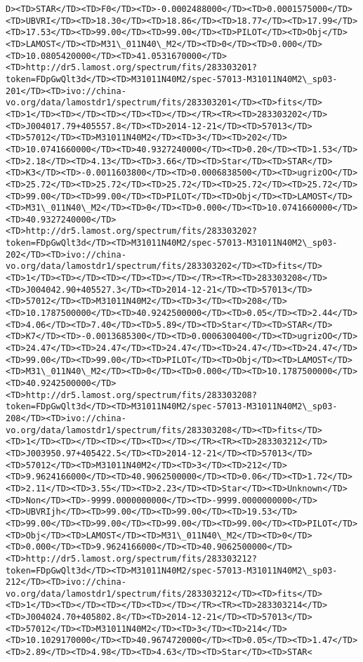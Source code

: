 \documentclass[11pt]{article}
\begin{document}
\begin{Verbatim}[commandchars=\\\{\}]
D><TD>STAR</TD><TD>F0</TD><TD>-0.0002488000</TD><TD>0.0001575000</TD><TD>UBVRI</TD><TD>18.30</TD><TD>18.86</TD><TD>18.77</TD><TD>17.99</TD><TD>17.53</TD><TD>99.00</TD><TD>99.00</TD><TD>PILOT</TD><TD>Obj</TD><TD>LAMOST</TD><TD>M31\_011N40\_M2</TD><TD>0</TD><TD>0.000</TD><TD>10.0805420000</TD><TD>41.0531670000</TD><TD>http://dr5.lamost.org/spectrum/fits/283303201?token=FDpGwQlt3d</TD><TD>M31011N40M2/spec-57013-M31011N40M2\_sp03-201</TD><TD>ivo://china-vo.org/data/lamostdr1/spectrum/fits/283303201</TD><TD>fits</TD><TD>1</TD><TD></TD><TD></TD><TD></TD></TR><TR><TD>283303202</TD><TD>J004017.79+405557.8</TD><TD>2014-12-21</TD><TD>57013</TD><TD>57012</TD><TD>M31011N40M2</TD><TD>3</TD><TD>202</TD><TD>10.0741660000</TD><TD>40.9327240000</TD><TD>0.20</TD><TD>1.53</TD><TD>2.18</TD><TD>4.13</TD><TD>3.66</TD><TD>Star</TD><TD>STAR</TD><TD>K3</TD><TD>-0.0011603800</TD><TD>0.0006838500</TD><TD>ugrizOO</TD><TD>25.72</TD><TD>25.72</TD><TD>25.72</TD><TD>25.72</TD><TD>25.72</TD><TD>99.00</TD><TD>99.00</TD><TD>PILOT</TD><TD>Obj</TD><TD>LAMOST</TD><TD>M31\_011N40\_M2</TD><TD>0</TD><TD>0.000</TD><TD>10.0741660000</TD><TD>40.9327240000</TD><TD>http://dr5.lamost.org/spectrum/fits/283303202?token=FDpGwQlt3d</TD><TD>M31011N40M2/spec-57013-M31011N40M2\_sp03-202</TD><TD>ivo://china-vo.org/data/lamostdr1/spectrum/fits/283303202</TD><TD>fits</TD><TD>1</TD><TD></TD><TD></TD><TD></TD></TR><TR><TD>283303208</TD><TD>J004042.90+405527.3</TD><TD>2014-12-21</TD><TD>57013</TD><TD>57012</TD><TD>M31011N40M2</TD><TD>3</TD><TD>208</TD><TD>10.1787500000</TD><TD>40.9242500000</TD><TD>0.05</TD><TD>2.44</TD><TD>4.06</TD><TD>7.40</TD><TD>5.89</TD><TD>Star</TD><TD>STAR</TD><TD>K7</TD><TD>-0.0013685300</TD><TD>0.0006300400</TD><TD>ugrizOO</TD><TD>24.47</TD><TD>24.47</TD><TD>24.47</TD><TD>24.47</TD><TD>24.47</TD><TD>99.00</TD><TD>99.00</TD><TD>PILOT</TD><TD>Obj</TD><TD>LAMOST</TD><TD>M31\_011N40\_M2</TD><TD>0</TD><TD>0.000</TD><TD>10.1787500000</TD><TD>40.9242500000</TD><TD>http://dr5.lamost.org/spectrum/fits/283303208?token=FDpGwQlt3d</TD><TD>M31011N40M2/spec-57013-M31011N40M2\_sp03-208</TD><TD>ivo://china-vo.org/data/lamostdr1/spectrum/fits/283303208</TD><TD>fits</TD><TD>1</TD><TD></TD><TD></TD><TD></TD></TR><TR><TD>283303212</TD><TD>J003950.97+405422.5</TD><TD>2014-12-21</TD><TD>57013</TD><TD>57012</TD><TD>M31011N40M2</TD><TD>3</TD><TD>212</TD><TD>9.9624166000</TD><TD>40.9062500000</TD><TD>0.06</TD><TD>1.72</TD><TD>2.11</TD><TD>3.55</TD><TD>2.23</TD><TD>Star</TD><TD>Unknown</TD><TD>Non</TD><TD>-9999.0000000000</TD><TD>-9999.0000000000</TD><TD>UBVRIjh</TD><TD>99.00</TD><TD>99.00</TD><TD>19.53</TD><TD>99.00</TD><TD>99.00</TD><TD>99.00</TD><TD>99.00</TD><TD>PILOT</TD><TD>Obj</TD><TD>LAMOST</TD><TD>M31\_011N40\_M2</TD><TD>0</TD><TD>0.000</TD><TD>9.9624166000</TD><TD>40.9062500000</TD><TD>http://dr5.lamost.org/spectrum/fits/283303212?token=FDpGwQlt3d</TD><TD>M31011N40M2/spec-57013-M31011N40M2\_sp03-212</TD><TD>ivo://china-vo.org/data/lamostdr1/spectrum/fits/283303212</TD><TD>fits</TD><TD>1</TD><TD></TD><TD></TD><TD></TD></TR><TR><TD>283303214</TD><TD>J004024.70+405802.8</TD><TD>2014-12-21</TD><TD>57013</TD><TD>57012</TD><TD>M31011N40M2</TD><TD>3</TD><TD>214</TD><TD>10.1029170000</TD><TD>40.9674720000</TD><TD>0.05</TD><TD>1.47</TD><TD>2.89</TD><TD>4.98</TD><TD>4.63</TD><TD>Star</TD><TD>STAR<
\end{Verbatim}
\end{document}

